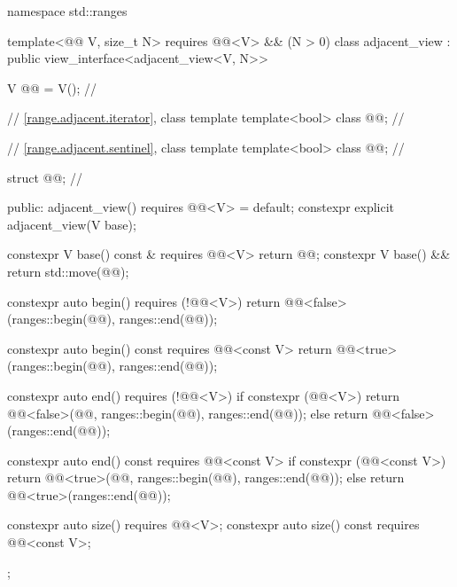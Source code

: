 \begin{codeblock}
namespace std::ranges {
  template<@@ V, size_t N>
    requires @@<V> && (N > 0)
  class adjacent_view : public view_interface<adjacent_view<V, N>> {
    V @@ = V();                      // \expos

    // \ref{range.adjacent.iterator}, class template 
    template<bool> class @@;      // \expos

    // \ref{range.adjacent.sentinel}, class template 
    template<bool> class @@;      // \expos

    struct @@{};               // \expos

  public:
    adjacent_view() requires @@<V> = default;
    constexpr explicit adjacent_view(V base);

    constexpr V base() const & requires @@<V> { return @@; }
    constexpr V base() && { return std::move(@@); }

    constexpr auto begin() requires (!@@<V>) {
      return @@<false>(ranges::begin(@@), ranges::end(@@));
    }

    constexpr auto begin() const requires @@<const V> {
      return @@<true>(ranges::begin(@@), ranges::end(@@));
    }

    constexpr auto end() requires (!@@<V>) {
      if constexpr (@@<V>) {
        return @@<false>(@@{}, ranges::begin(@@), ranges::end(@@));
      } else {
        return @@<false>(ranges::end(@@));
      }
    }

    constexpr auto end() const requires @@<const V> {
      if constexpr (@@<const V>) {
        return @@<true>(@@{}, ranges::begin(@@), ranges::end(@@));
      } else {
        return @@<true>(ranges::end(@@));
      }
    }

    constexpr auto size() requires @@<V>;
    constexpr auto size() const requires @@<const V>;
  };
}
\end{codeblock}

